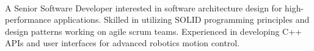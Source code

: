 \\
\begin{cvparagraph}
A Senior Software Developer interested in software architecture design for high-performance applications. Skilled in utilizing SOLID programming principles and design patterns working on agile scrum teams. Experienced in developing C++ APIs and user interfaces for advanced robotics motion control. 
\end{cvparagraph}